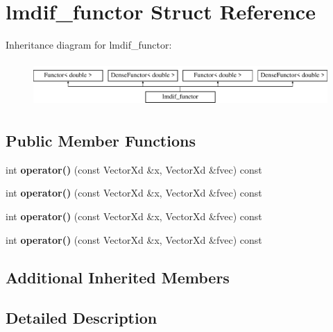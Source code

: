 \hypertarget{structlmdif__functor}{}\section{lmdif\+\_\+functor Struct Reference}
\label{structlmdif__functor}
Inheritance diagram for lmdif\+\_\+functor\+:\begin{figure}[H]
\begin{center}
\leavevmode
\includegraphics[height=1.728395cm]{structlmdif__functor}
\end{center}
\end{figure}
\subsection*{Public Member Functions}
\begin{DoxyCompactItemize}
\item 
\mbox{\label{structlmdif__functor_a2693a08337b91d9dcb5c3f56d29ac0c3}} 
int {\bfseries operator()} (const Vector\+Xd \&x, Vector\+Xd \&fvec) const
\item 
\mbox{\label{structlmdif__functor_a2693a08337b91d9dcb5c3f56d29ac0c3}} 
int {\bfseries operator()} (const Vector\+Xd \&x, Vector\+Xd \&fvec) const
\item 
\mbox{\label{structlmdif__functor_a2693a08337b91d9dcb5c3f56d29ac0c3}} 
int {\bfseries operator()} (const Vector\+Xd \&x, Vector\+Xd \&fvec) const
\item 
\mbox{\label{structlmdif__functor_a2693a08337b91d9dcb5c3f56d29ac0c3}} 
int {\bfseries operator()} (const Vector\+Xd \&x, Vector\+Xd \&fvec) const
\end{DoxyCompactItemize}
\subsection*{Additional Inherited Members}


\subsection{Detailed Description}


